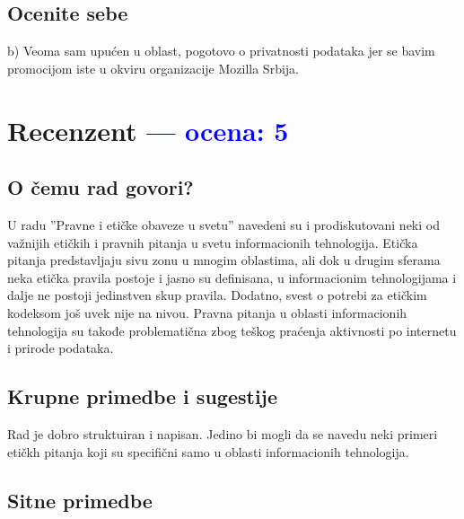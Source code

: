 \documentclass[a4paper]{report}
\newcommand{\odgovor}[1]{\textcolor{blue}{#1}}
\begin{document}
\section{Ocenite sebe}
b) Veoma sam upućen u oblast, pogotovo o privatnosti podataka jer se bavim promocijom iste u okviru organizacije Mozilla Srbija.

\chapter{Recenzent \odgovor{--- ocena: 5} }


\section{O čemu rad govori?}

U radu ''Pravne i etičke obaveze u svetu'' navedeni su i prodiskutovani neki od važnijih etičkih i pravnih pitanja u svetu informacionih tehnologija. Etička pitanja predstavljaju sivu zonu u mnogim oblastima, ali dok u drugim sferama neka etička pravila postoje i jasno su definisana, u informacionim tehnologijama i dalje ne postoji jedinstven skup pravila. Dodatno, svest o potrebi za etičkim kodeksom još uvek nije na nivou. Pravna pitanja u oblasti informacionih tehnologija su takođe problematična zbog teškog praćenja aktivnosti po internetu i prirode podataka.

\section{Krupne primedbe i sugestije}
Rad je dobro struktuiran i napisan. Jedino bi mogli da se navedu neki primeri etičkh pitanja koji su specifični samo u oblasti informacionih tehnologija. 

\section{Sitne primedbe}
\end{document}
